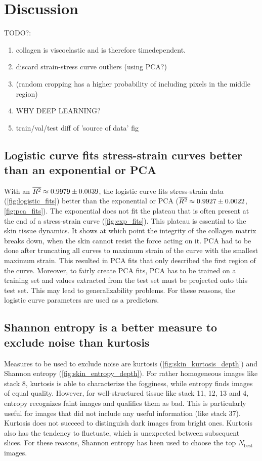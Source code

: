 \chapter{Discussion}

TODO?:
\begin{enumerate}
    \item collagen is viscoelastic and is therefore timedependent.
    \item discard strain-stress curve outliers (using PCA?)
    \item (random cropping has a higher probability of including pixels in the middle region)
    \item WHY DEEP LEARNING?
    \item train/val/test diff of 'source of data' fig
\end{enumerate}

\section{Logistic curve fits stress-strain curves better than an exponential or PCA}
With an $\overline{R^2} \approx \num{0.9979 \pm 0.0039}$, the logistic curve fits stress-strain data (\cref{fig:logistic_fits}) better than the exponential or PCA ($\overline{R^2} \approx \num{0.9927 \pm 0.0022}$, \cref{fig:pca_fits}).
The exponential does not fit the plateau that is often present at the end of a stress-strain curve (\cref{fig:exp_fits}).
This plateau is essential to the skin tissue dynamics.
It shows at which point the integrity of the collagen matrix breaks down, \ie when the skin cannot resist the force acting on it.
PCA had to be done after truncating all curves to maximum strain of the curve with the smallest maximum strain.
This resulted in PCA fits that only described the first region of the curve.
Moreover, to fairly create PCA fits, PCA has to be trained on a training set and values extracted from the test set must be projected onto this test set.
This may lead to generalizability problems.
For these reasons, the logistic curve parameters are used as a predictors.

\section{Shannon entropy is a better measure to exclude noise than kurtosis}\label{sec:disc_ent_vs_kur}
Measures to be used to exclude noise are kurtosis (\cref{fig:skin_kurtosis_depth}) and Shannon entropy (\cref{fig:skin_entropy_depth}).
For rather homogeneous images like stack 8, kurtosis is able to characterize the fogginess, while entropy finds images of equal quality.
However, for well-structured tissue like stack 11, 12, 13 and 4, entropy recognizes faint images and qualifies them as bad.
This is particularly useful for images that did not include any useful information (like stack 37).
Kurtosis does not succeed to distinguish dark images from bright ones.
Kurtosis also has the tendency to fluctuate, which is unexpected between subsequent slices.
For these reasons, Shannon entropy has been used to choose the top $N_\mathrm{best}$ images.

